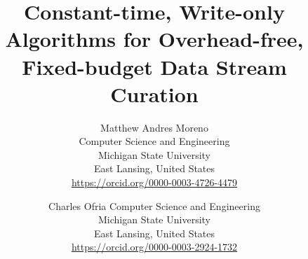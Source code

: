\title{ Constant-time, Write-only Algorithms for Overhead-free, Fixed-budget Data Stream Curation }

\author{
Matthew Andres Moreno\\
Computer Science and Engineering \\
Michigan State University\\
East Lansing, United States \\
\url{https://orcid.org/0000-0003-4726-4479} \\
\and
Charles Ofria
Computer Science and Engineering \\
Michigan State University\\
East Lansing, United States \\
\url{https://orcid.org/0000-0003-2924-1732}
}

\maketitle
